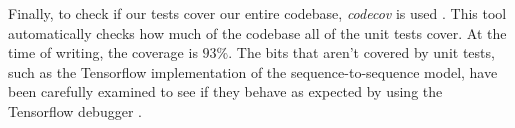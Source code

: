 Finally, to check if our tests cover our entire codebase, \textit{codecov} is used \cite{codecov}.
This tool automatically checks how much of the codebase all of the unit tests cover.
At the time of writing, the coverage is $93\%$.
The bits that aren't covered by unit tests, such as the Tensorflow implementation of the sequence-to-sequence model, have been carefully examined to see if they behave as expected by using the Tensorflow debugger \cite{tensorflow}.
